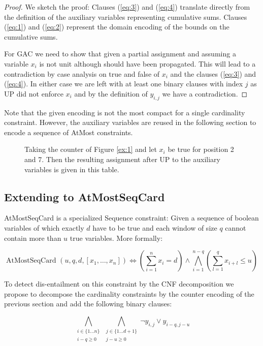 \documentclass[]{llncs}
\newcommand{\AtMostSeqCard}{AtMostSeqCard }
\begin{document}
\begin{proof}
    We sketch the proof: Clauses (\ref{eq:3}) and (\ref{eq:4}) translate
    directly from the definition of the auxiliary variables representing
    cumulative sums.  Clauses (\ref{eq:1}) and (\ref{eq:2}) represent
    the domain encoding of the bounds on the cumulative sums. 
    
    For GAC we need to show that given a partial assignment and assuming
    a variable $x_i$ is not unit although should have been propagated.
    This will lead to a contradiction by case analysis on true and false
    of $x_i$ and the clauses (\ref{eq:3}) and (\ref{eq:4}). In either
    case we are left with at least one binary clauses with index $j$ as
    UP did not enforce $x_i$ and by the definition of $y_{i,j}$ we have a
    contradiction. 
\end{proof}

Note that the given encoding is not the most compact for a single
cardinality constraint.  However, the auxiliary variables are reused in
the following section to encode a sequence of AtMost constraints.        


\begin{figure}
\centering 
\caption{Taking the counter of Figure \ref{ex:1} and let $x_{i}$ be
true for position 2 and 7. Then the resulting assignment after UP to the
auxiliary variables is given in this table. } 
%
\label{ex:2}
\end{figure}


\subsection{Extending to \AtMostSeqCard}

\AtMostSeqCard is a specialized Sequence constraint: Given a sequence of
boolean variables of which exactly $d$ have to be true and each window
of size $q$ cannot contain more than $u$ true variables. More formally: 

$$ \text{\AtMostSeqCard}(u,q,d,[x_{1},\ldots,x_{n}]) \iff (\sum_{i=1}^n
x_{i} = d) \wedge \bigwedge_{i=1}^{n-q}(\sum_{l=1}^q x_{i+l} \leq u )$$

To detect dis-entailment on this constraint by the CNF decomposition we
propose to decompose the cardinality constraints by the counter encoding
of the previous section and add the following binary clauses:

\begin{equation} \label{eq:6}
    \bigwedge_{\substack{i \in \{1 \ldots n\} \\ i-q \geq 0}}
    \bigwedge_{\substack{j\in\{1\ldots d+1\}\\ j-u \geq 0}}
    \neg y_{i,j} \vee y_{i-q,j-u}
\end{equation}               
\end{document}
